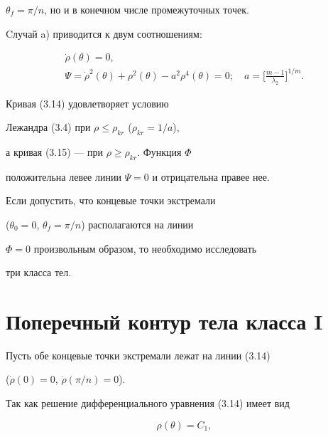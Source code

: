 $\theta_f = \pi / n$, но и в конечном числе промежуточных точек.





Cлучай a) приводится к двум соотношениям:


\begin{gather}


\Dot{\rho}(\theta) = 0, \\


\Psi = \Dot{\rho}^2 (\theta) + \rho^2 (\theta)


- a^2 \rho^4 (\theta) = 0; \quad


a = \bigg[ \frac {m-1}{\lambda_2} \bigg]^{1/m}.


\end{gather}





Кривая (3.14) удовлетворяет условию


Лежандра (3.4) при $\rho \le \rho_{kr}$ ($\rho_{kr}= 1 / a$),


а кривая (3.15) --- при $\rho \ge \rho_{kr}$. Функция $\Phi$


положительна левее линии $\Psi = 0$ и отрицательна правее нее.


Если допустить, что концевые точки экстремали


($\theta_0 = 0$, $\theta_f = \pi/n$) располагаются на линии


$\Phi = 0$ произвольным образом, то необходимо исследовать


три класса тел.





\section{Поперечный контур тела класса I}





Пусть обе концевые точки экстремали лежат на линии (3.14)


($\Dot{\rho}(0) = 0$, $\Dot{\rho} (\pi / n) = 0$).


Так как решение дифференциального уравнения (3.14) имеет вид


\begin{equation}


\rho (\theta) = C_1,


\end{equation}


